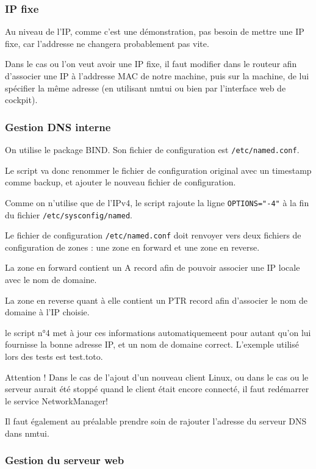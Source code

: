 \documentclass{article}
\begin{document}
\subsubsection{IP fixe}

Au niveau de l'IP, comme c'est une démonstration, pas besoin de mettre une IP fixe, car l'addresse ne changera probablement pas vite.

Dans le cas ou l'on veut avoir une IP fixe, il faut modifier dans le routeur afin d'associer une IP à l'addresse MAC de notre machine, puis sur la machine, de lui spécifier la même adresse (en utilisant nmtui ou bien par l'interface web de cockpit).

\subsubsection{Gestion DNS interne}

On utilise le package BIND. Son fichier de configuration est \texttt{/etc/named.conf}.

Le script va donc renommer le fichier de configuration original avec un timestamp comme backup, et ajouter le nouveau fichier de configuration.

Comme on n'utilise que de l'IPv4, le script rajoute la ligne \texttt{OPTIONS="-4"} à la fin du fichier \texttt{/etc/sysconfig/named}.

Le fichier de configuration \texttt{/etc/named.conf} doit renvoyer vers deux fichiers de configuration de zones : une zone en forward et une zone en reverse.

La zone en forward contient un A record afin de pouvoir associer une IP locale avec le nom de domaine.

La zone en reverse quant à elle contient un PTR record afin d'associer le nom de domaine à l'IP choisie.

le script n°4 met à jour ces informations automatiquemeent pour autant qu'on lui fournisse la bonne adresse IP, et un nom de domaine correct. L'exemple utilisé lors des tests est test.toto.

Attention ! Dans le cas de l'ajout d'un nouveau client Linux, ou dans le cas ou le serveur aurait été stoppé quand le client était encore connecté, il faut redémarrer le service NetworkManager!

Il faut également au préalable prendre soin de rajouter l'adresse du serveur DNS dans nmtui.

\subsubsection{Gestion du serveur web}
\end{document}
